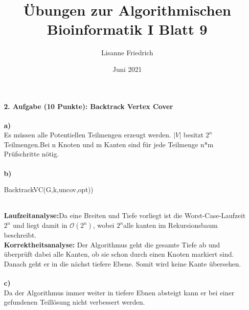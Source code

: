 \documentclass{article}
\title{Übungen zur Algorithmischen Bioinformatik I
Blatt 9}
\author{Lisanne Friedrich }
\date{Juni 2021}
\begin{document}
\maketitle
\textbf{2. Aufgabe (10 Punkte): Backtrack Vertex Cover}\\ \\
\textbf{a) } \\
Es müssen alle Potentiellen Teilmengen erzeugt werden. $\vert V\vert$ besitzt $2^n$ Teilmengen.Bei n Knoten und m Kanten sind für jede Teilmenge n*m Prüfschritte nötig.\\ \\
 \textbf{b) }
 \begin{algorithm}
    \NoCaptionOfAlgo
    \caption{BacktrackVC(G,k,uncov,opt))}
\end{algorithm}\\
\textbf{Laufzeitanalyse:}Da eine Breiten und Tiefe vorliegt ist die Worst-Case-Laufzeit $2^n$ und liegt damit in $\mathcal{O}(2^n)$, wobei $2^n $alle kanten im Rekursionsbaum beschreibt.\\
\textbf{Korrektheitsanalyse: } Der Algorithmus geht die gesamte Tiefe ab und überprüft dabei alle Kanten, ob sie schon durch einen Knoten markiert sind. Danach geht er in die nächst tiefere Ebene. Somit wird keine Kante übersehen.\\ \\
\textbf{c)  }\\
Da der Algorithmus immer weiter in tiefere Ebnen absteigt kann er bei einer gefundenen Teillösung nicht verbessert werden.
\end{document}

